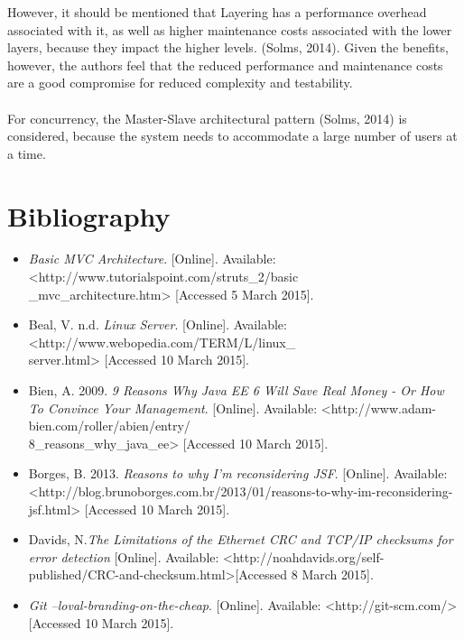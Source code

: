 \documentclass[a4paper,12pt]{article}
\begin{document}
		However, it should be mentioned that Layering has a performance overhead associated with it, as well as higher maintenance costs associated with the lower layers, because they impact the higher levels. (Solms, 2014). Given the benefits, however, the authors feel that the reduced performance and maintenance costs are a good compromise for reduced complexity and testability.\\
		\\
		For concurrency, the Master-Slave architectural pattern (Solms, 2014) is considered, because the system needs to accommodate a large number of users at a time.

\newpage
\section{Bibliography}
		\begin{itemize}
			\item \textit{Basic MVC Architecture}. [Online]. Available: <http://www.tutorialspoint.com/struts\_2/basic\\\_mvc\_architecture.htm> [Accessed 5 March 2015].
			
			\item Beal, V. n.d. \textit{Linux Server}. [Online]. Available: <http://www.webopedia.com/TERM/L/linux\_\\server.html> [Accessed 10 March 2015].

			\item Bien, A. 2009. \textit{9 Reasons Why Java EE 6 Will Save Real Money - Or How To Convince Your Management}. [Online]. Available: <http://www.adam-bien.com/roller/abien/entry/\\8\_reasons\_why\_java\_ee> [Accessed 10 March 2015].

			\item Borges, B. 2013. \textit{Reasons to why I'm reconsidering JSF}. [Online]. Available: <http://blog.brunoborges.com.br/2013/01/reasons-to-why-im-reconsidering-jsf.html> [Accessed 10 March 2015].
			
			\item Davids, N.\textit{The Limitations of the Ethernet CRC and TCP/IP checksums for error detection} [Online]. Available: 
			<http://noahdavids.org/self-published/CRC-and-checksum.html>[Accessed 8 March 2015].

			\item \textit{Git --loval-branding-on-the-cheap}. [Online]. Available: <http://git-scm.com/> [Accessed 10 March 2015].


\end{itemize}
\end{document}

